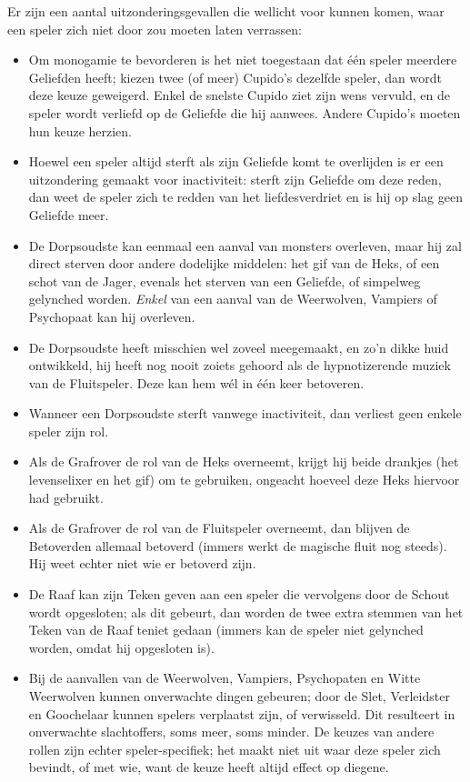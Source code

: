 \documentclass[12pt]{article}
\begin{document}
    Er zijn een aantal uitzonderingsgevallen die wellicht voor kunnen komen, waar een speler zich niet door zou moeten laten verrassen:
  
    \begin{itemize}
  	\item Om monogamie te bevorderen is het niet toegestaan dat \'e\'en speler meerdere Geliefden heeft; kiezen twee (of meer) Cupido's dezelfde speler, dan wordt deze keuze geweigerd. Enkel de snelste Cupido ziet zijn wens vervuld, en de speler wordt verliefd op de Geliefde die hij aanwees. Andere Cupido's moeten hun keuze herzien.
  	\item Hoewel een speler altijd sterft als zijn Geliefde komt te overlijden is er een uitzondering gemaakt voor inactiviteit: sterft zijn Geliefde om deze reden, dan weet de speler zich te redden van het liefdesverdriet en is hij op slag geen Geliefde meer.
  	\item De Dorpsoudste kan eenmaal een aanval van monsters overleven, maar hij zal direct sterven door andere dodelijke middelen: het gif van de Heks, of een schot van de Jager, evenals het sterven van een Geliefde, of simpelweg gelynched worden. \emph{Enkel} van een aanval van de Weerwolven, Vampiers of Psychopaat kan hij overleven.
  	\item De Dorpsoudste heeft misschien wel zoveel meegemaakt, en zo'n dikke huid ontwikkeld, hij heeft nog nooit zoiets gehoord als de hypnotizerende muziek van de Fluitspeler. Deze kan hem w\'el in \'e\'en keer betoveren.
  	\item Wanneer een Dorpsoudste sterft vanwege inactiviteit, dan verliest geen enkele speler zijn rol.
  	\item Als de Grafrover de rol van de Heks overneemt, krijgt hij beide drankjes (het levenselixer en het gif) om te gebruiken, ongeacht hoeveel deze Heks hiervoor had gebruikt.
  	\item Als de Grafrover de rol van de Fluitspeler overneemt, dan blijven de Betoverden allemaal betoverd (immers werkt de magische fluit nog steeds). Hij weet echter niet wie er betoverd zijn.
  	\item De Raaf kan zijn Teken geven aan een speler die vervolgens door de Schout wordt opgesloten; als dit gebeurt, dan worden de twee extra stemmen van het Teken van de Raaf teniet gedaan (immers kan de speler niet gelynched worden, omdat hij opgesloten is).
  	\item Bij de aanvallen van de Weerwolven, Vampiers, Psychopaten en Witte Weerwolven kunnen onverwachte dingen gebeuren; door de Slet, Verleidster en Goochelaar kunnen spelers verplaatst zijn, of verwisseld. Dit resulteert in onverwachte slachtoffers, soms meer, soms minder. De keuzes van andere rollen zijn echter speler-specifiek; het maakt niet uit waar deze speler zich bevindt, of met wie, want de keuze heeft altijd effect op diegene.

\end{itemize}
\end{document}
